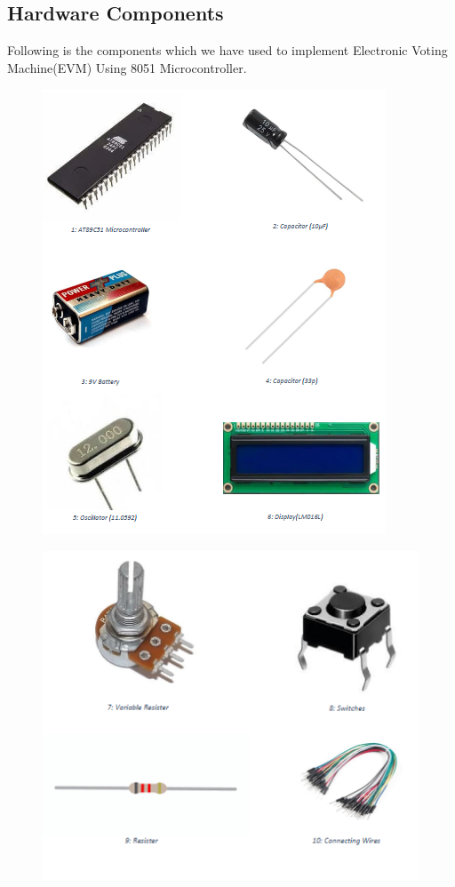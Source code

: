 \subsection{Hardware Components}
Following is the components which we have used to implement Electronic Voting Machine(EVM) Using 8051 Microcontroller.
\begin{figure}[H]  %
\begin{center}
\includegraphics[scale=0.95]{Chapter3/comp1}
\end{center}
\end{figure}
\begin{figure}[H]  %
\begin{center}
\includegraphics[scale=0.95]{Chapter3/comp2}
\end{center}
\end{figure}


